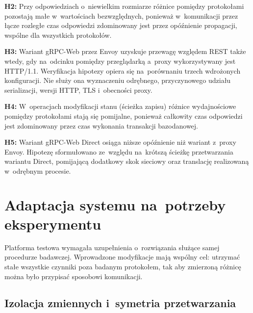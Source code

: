 \begin{sloppypar}
\textbf{H2:} Przy odpowiedziach o~niewielkim rozmiarze różnice pomiędzy protokołami pozostają małe w~wartościach bezwzględnych, ponieważ w~komunikacji przez łącze rozległe czas odpowiedzi zdominowany jest przez opóźnienie propagacji, wspólne dla wszystkich protokołów.
\end{sloppypar}

\begin{sloppypar}
\textbf{H3:} Wariant gRPC-Web przez Envoy uzyskuje przewagę względem REST także wtedy, gdy na~odcinku pomiędzy przeglądarką a~proxy wykorzystywany jest HTTP/1.1. Weryfikacja hipotezy opiera się na~porównaniu trzech wdrożonych konfiguracji. Nie służy ona wyznaczeniu odrębnego, przyczynowego udziału serializacji, wersji HTTP, TLS i~obecności proxy.
\end{sloppypar}

\begin{sloppypar}
\textbf{H4:} W~operacjach modyfikacji stanu (ścieżka zapisu) różnice wydajnościowe pomiędzy protokołami stają się pomijalne, ponieważ całkowity czas odpowiedzi jest zdominowany przez czas wykonania transakcji bazodanowej.
\end{sloppypar}

\textbf{H5:} Wariant gRPC-Web Direct osiąga niższe opóźnienie niż wariant z~proxy Envoy. Hipotezę sformułowano ze~względu na~krótszą ścieżkę przetwarzania wariantu Direct, pomijającą dodatkowy skok sieciowy oraz translację realizowaną w~odrębnym procesie.

\section{Adaptacja systemu na~potrzeby eksperymentu}
\label{sec:AdaptacjaSystemu}

Platforma testowa wymagała uzupełnienia o~rozwiązania służące samej procedurze badawczej. Wprowadzone modyfikacje mają wspólny cel: utrzymać stałe wszystkie czynniki poza badanym protokołem, tak aby zmierzoną różnicę można było przypisać sposobowi komunikacji.

\subsection{Izolacja zmiennych i~symetria przetwarzania}
\label{subsec:IzolacjaZmiennych}

